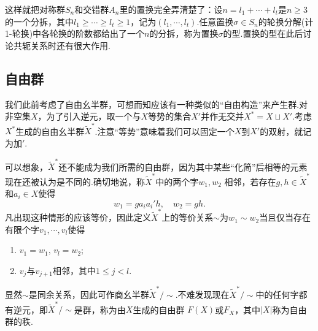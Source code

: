 这样就把对称群$S_n$和交错群$A_n$里的置换完全弄清楚了：设$n=l_1+\cdots+l_t$是$n\ge 3$的一个{\heiti 分拆}，其中$l_1\ge\cdots\ge l_t\ge 1$，记为$(l_1,\cdots,l_t)$.任意置换$\sigma\in S_n$的轮换分解(计1-轮换)中各轮换的阶数都给出了一个$n$的分拆，称为置换$\sigma$的{\heiti 型}.置换的型在此后讨论共轭关系时还有很大作用.

\subsection{自由群}\label{section:FreeGroup}
我们此前考虑了自由幺半群，可想而知应该有一种类似的“自由构造”来产生群.对非空集$X$，为了引入逆元，取一个与$X$等势的集合$X'$并作无交并$X^*=X\sqcup X'$.考虑$X^*$生成的自由幺半群$\widetilde{X}^*$.注意“等势”意味着我们可以固定一个$X$到$X'$的双射，就记为加$'$.

可以想象，$\widetilde{X}^*$还不能成为我们所需的自由群，因为其中某些“化简”后相等的元素现在还被认为是不同的.确切地说，称$\widetilde{X}^*$中的两个字$w_1,w_2$ {\heiti 相邻}，若存在$g,h\in\widetilde{X}^*$和$a_i\in X$使得
\[
	w_1=ga_ia_i'h,\quad w_2=gh.
\]
凡出现这种情形的应该等价，因此定义$\widetilde{X}^*$上的等价关系$\sim$为$w_1\sim w_2$当且仅当存在有限个字$v_1,\cdots,v_l$使得
\begin{enumerate}
	\item $v_1=w_1,\,v_l=w_2$;
	\item $v_j$与$v_{j+1}$相邻，其中$1\le j<l$.
\end{enumerate}
显然$\sim$是同余关系，因此可作商幺半群$\widetilde{X}^*/\sim$.不难发现现在$\widetilde{X}^*/\sim$中的任何字都有逆元，即$\widetilde{X}^*/\sim$是群，称为由$X$生成的{\heiti 自由群} $F(X)$或$F_X$，其中$|X|$称为自由群的{\heiti 秩}.

